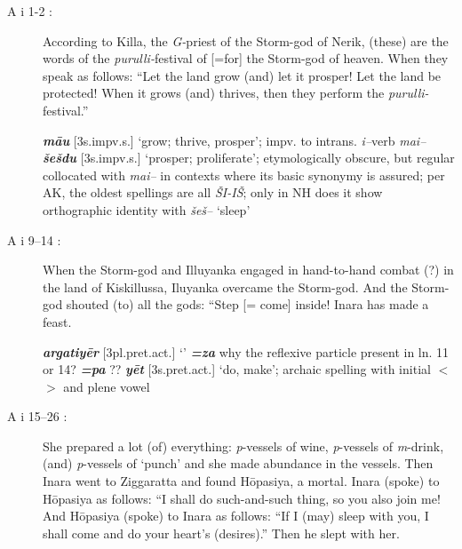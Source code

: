 \documentclass[10pt]{article}
\newcommand{\bit}[1]{\textbf{\textit{#1}}}				%
\newcommand{\p}[1]{{\tiny[{#1}]}}					%
\newcommand{\hith}{\textsubwedge{h}}
\newcommand{\hiverb}{\textit{{\hith}i--}verb}
\renewcommand{\.}[1]{\textsubdot{#1}}
\begin{document}
\begin{description}

\item[A i 1-2 :] According to Killa, the \textit{G-}priest of the Storm-god of Nerik, (these) are the words of the \textit{purulli-}festival of [=for] the Storm-god of heaven. When they speak as follows: ``Let the land grow (and) let it prosper! Let the land be protected! When it grows (and) thrives, then they perform the \textit{purulli-}festival.''

\begin{notes}

\bit{m\=au} \p{3s.impv.s.} `grow; thrive, prosper'; impv. to intrans. {\hiverb} \textit{mai--} \bit{\v{s}e\v{s}du} \p{3s.impv.s.} `prosper; proliferate'; etymologically obscure, but regular collocated with \textit{mai--} in contexts where its basic synonymy is assured; per AK, the oldest spellings are all \textit{\v{S}I-I\v{S}}; only in NH does it show orthographic identity with \textit{\v{s}e\v{s}--} `sleep' 

\end{notes}

\item[A i 9--14 :] When the Storm-god and Illuyanka engaged in hand-to-hand combat (?) in the land of Kiskillussa, Iluyanka overcame the Storm-god. And the Storm-god shouted (to) all the gods: ``Step [= come] inside! Inara has made a feast. 

\begin{notes}

\bit{argatiy\=er} \p{3pl.pret.act.} `' \bit{=za} why the reflexive particle present in ln. 11 or 14? \bit{=pa} ?? \bit{y\=et} \p{3s.pret.act.} `do, make'; archaic spelling with initial $<$\textit{}$>$ and plene vowel

\end{notes}

\item[A i 15--26 :] 

She prepared a lot (of) everything: \textit{p}-vessels of wine, \textit{p}-vessels of \textit{m}-drink, (and) \textit{p}-vessels of `punch' and she made abundance in the vessels. Then Inara went to Ziggaratta and found H\=opasiya, a mortal. Inara (spoke) to H\=opasiya as follows: ``I shall do such-and-such thing, so you also join me! And H\=opasiya (spoke) to Inara as follows: ``If I (may) sleep with you, I shall come and do your heart's (desires).'' Then he slept with her. 

\begin{notes}


\end{notes}
\end{description}
\end{document}
